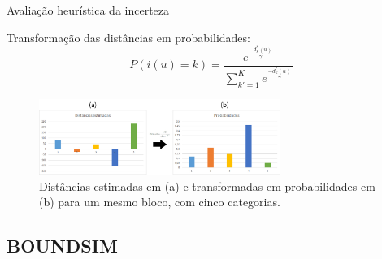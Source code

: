 \documentclass[aspectratio=169]{beamer}
\begin{document}
\begin{frame}{Avaliação heurística da incerteza}

Transformação das distâncias em probabilidades:
	\begin{equation}
	P(i(u)=k)=\frac{e^\frac{-d^*_k(u)}{\gamma}}{\sum_{k'=1}^{K}e^\frac{-d^*_k(u)}{\gamma}}
	\label{eq_softmax}
	\end{equation}
	
	\begin{figure}[H]
		\caption{\label{softmax_grafico}Distâncias estimadas em (a) e transformadas em probabilidades em (b) para um mesmo bloco, com cinco categorias.}
		\begin{center}
			\includegraphics[width=0.7\textwidth]{capitulo_2/softmax_bars_final.jpg}
		\end{center}
	\end{figure}
\end{frame}

\subsection{BOUNDSIM}
\end{document}

